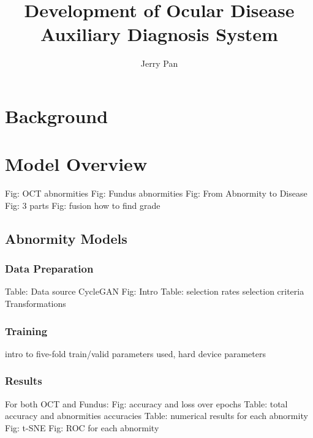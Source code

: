 \documentclass{article}
\begin{document}
	\title{\vspace{-2.25cm} Development of Ocular Disease Auxiliary Diagnosis System}
	\author{Jerry Pan}
	\date{}
	\maketitle
	
	\vspace{0.5cm}
	\tableofcontents
	
	\pagebreak
	
	\section{Background}
	
	\section{Model Overview}
		
		Fig: OCT abnormities
		Fig: Fundus abnormities
		Fig: From Abnormity to Disease
		Fig: 3 parts
		Fig: fusion
		how to find grade
	
	\subsection{Abnormity Models}
	
		\subsubsection{Data Preparation}
		
			Table: Data source
			CycleGAN
				Fig: Intro
				Table: selection rates
				selection criteria
			Transformations
			
		\subsubsection{Training}
			
			intro to five-fold train/valid
			parameters used, hard device parameters
			
		\subsubsection{Results}
			
			For both OCT and Fundus:
				Fig: accuracy and loss over epochs
				Table: total accuracy and abnormities accuracies
				Table: numerical results for each abnormity
				Fig: t-SNE
				Fig: ROC for each abnormity
				
\end{document}

